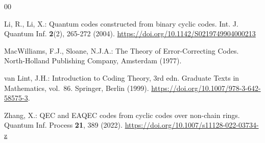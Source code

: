 \documentclass[12pt]{article}
\theoremstyle{definition}
\theoremstyle{plain}
\begin{document}
\begin{thebibliography}{00}





 Li, R., Li, X.: Quantum codes constructed from binary cyclic codes. Int. J. Quantum Inf. \textbf{2}(2), 265-272 (2004).  \href{https://doi.org/10.1142/S0219749904000213}{https://doi.org/10.1142/S0219749904000213} 



  MacWilliams, F.J., Sloane, N.J.A.: The Theory of Error-Correcting Codes. North-Holland Publishing Company, Amsterdam (1977).

van Lint, J.H.: Introduction to Coding Theory, 3rd edn. Graduate Texts in Mathematics, vol.~86. Springer, Berlin (1999). \href{https://doi.org/10.1007/978-3-642-58575-3}{https://doi.org/10.1007/978-3-642-58575-3}.


 Zhang, X.: QEC and EAQEC codes from cyclic codes over non-chain rings. Quantum Inf. Process \textbf{21}, 389 (2022). \href{https://doi.org/10.1007/s11128-022-03734-z}{https://doi.org/10.1007/s11128-022-03734-z}



\end{thebibliography}
\end{document}

